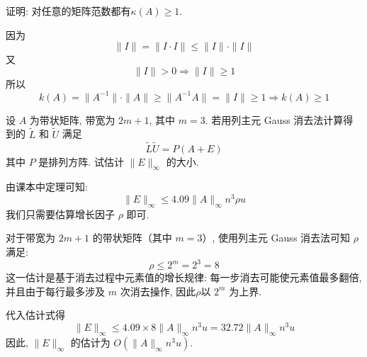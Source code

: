 \documentclass[12pt, answers]{exam}     %
\begin{document}
\begin{questions}
\question{}
证明: 对任意的矩阵范数都有$\kappa(A) \geq 1$.

\begin{solution}
因为
\[
\|I\|=\|I \cdot I\|\le\|I\|\cdot\|I\|
\]
又
\[
\|I\| > 0 \Rightarrow \|I\|\ge1
\]
所以
\[
k(A)=\|A^{-1}\|\cdot\|A\|\geq\|A^{-1}A\|=\|I\|\geq1 \Rightarrow k(A)\geq1
\]
\end{solution}

\question{}
设 $A$ 为带状矩阵, 带宽为 $2m+1$, 其中 $m=3$. 若用列主元 Gauss 消去法计算得到的 $\widetilde{L}$ 和 $\widetilde{U}$ 满足
\[
\widetilde{L} \widetilde{U} = P(A + E)
\]
其中 $P$ 是排列方阵. 试估计 $\|E\|_{\infty}$ 的大小.

\begin{solution}
由课本中定理可知: 
\[
\|E\|_{\infty} \leq 4.09 \|A\|_{\infty} n^3 \rho u
\]
我们只需要估算增长因子 \(\rho\) 即可.

对于带宽为 \(2m+1\) 的带状矩阵（其中 \(m=3\)）, 使用列主元 Gauss 消去法可知 \(\rho\) 满足: 
\[
\rho \leq 2^m = 2^3 = 8
\]
这一估计是基于消去过程中元素值的增长规律: 每一步消去可能使元素值最多翻倍, 并且由于每行最多涉及 \(m\) 次消去操作, 因此\(\rho\)以 \(2^m\) 为上界.

代入估计式得
\[
\|E\|_{\infty} \leq 4.09 \times 8 \|A\|_{\infty} n^3 u = 32.72 \|A\|_{\infty} n^3 u
\]
因此, \(\|E\|_{\infty}\) 的估计为 \(O(\|A\|_{\infty} n^3 u)\).
\end{solution}


\end{questions}
\end{document}

